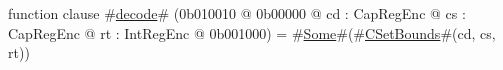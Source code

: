 function clause #\hyperref[sailMIPSzdecode]{decode}# (0b010010 @ 0b00000 @ cd : CapRegEnc @ cs : CapRegEnc @ rt : IntRegEnc @ 0b001000) = #\hyperref[sailMIPSzSome]{Some}#(#\hyperref[sailMIPSzCSetBounds]{CSetBounds}#(cd, cs, rt))
